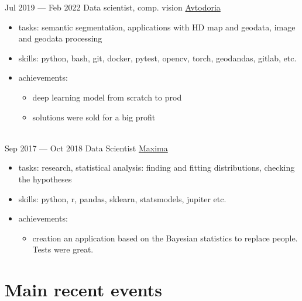 \documentclass[letterpaper]{twentysecondcv} %
\begin{document}
\begin{twenty}
        \twentyitem
        {Jul 2019 —}
        {Feb 2022}
        {Data scientist, comp. vision}
        {  \href{https://avtodoria.ru/}{Avtodoria}}
        {}
        {
        {\begin{itemize}
            \item tasks: semantic segmentation, applications with HD map and geodata, image and geodata processing
            \item skills: python, bash, git, docker, pytest, opencv, torch, geodandas, gitlab,  etc.
            \item achievements:
            {\begin{itemize}
                \item deep learning model from scratch to prod
                \item solutions were sold for a big profit
            \end{itemize}
            }            
        \end{itemize}}
        }
        \\
        \twentyitem
        {Sep 2017 —}
        {Oct 2018}
        {Data Scientist}
        {\href{http://maxima.life/}{Maxima}}
        {}
        {
        {\begin{itemize}
            \item tasks: research, statistical analysis: finding and fitting distributions, checking the hypotheses
            \item skills: python, r, pandas, sklearn, statsmodels, jupiter etc.
            \item achievements:
            {\begin{itemize}
                \item creation an application based on the Bayesian statistics to replace people. Tests were great.
            \end{itemize}
            }            
        \end{itemize}}
        }
\end{twenty}


\section{Main recent events}
\end{document}
